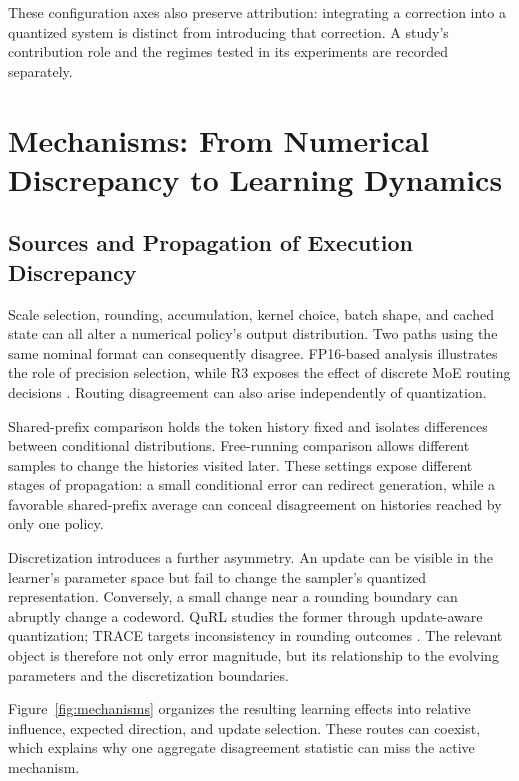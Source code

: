 These configuration axes also preserve attribution: integrating a correction into a quantized system is distinct from introducing that correction. A study's contribution role and the regimes tested in its experiments are recorded separately.

\section{Mechanisms: From Numerical Discrepancy to Learning Dynamics}\label{sec:mechanisms}
\subsection{Sources and Propagation of Execution Discrepancy}
Scale selection, rounding, accumulation, kernel choice, batch shape, and cached state can all alter a numerical policy's output distribution. Two paths using the same nominal format can consequently disagree. FP16-based analysis illustrates the role of precision selection, while R3 exposes the effect of discrete MoE routing decisions \citep{fp16,r3}. Routing disagreement can also arise independently of quantization.

Shared-prefix comparison holds the token history fixed and isolates differences between conditional distributions. Free-running comparison allows different samples to change the histories visited later. These settings expose different stages of propagation: a small conditional error can redirect generation, while a favorable shared-prefix average can conceal disagreement on histories reached by only one policy.

Discretization introduces a further asymmetry. An update can be visible in the learner's parameter space but fail to change the sampler's quantized representation. Conversely, a small change near a rounding boundary can abruptly change a codeword. QuRL studies the former through update-aware quantization; TRACE targets inconsistency in rounding outcomes \citep{qurl,trace}. The relevant object is therefore not only error magnitude, but its relationship to the evolving parameters and the discretization boundaries.

Figure~\ref{fig:mechanisms} organizes the resulting learning effects into relative influence, expected direction, and update selection. These routes can coexist, which explains why one aggregate disagreement statistic can miss the active mechanism.

